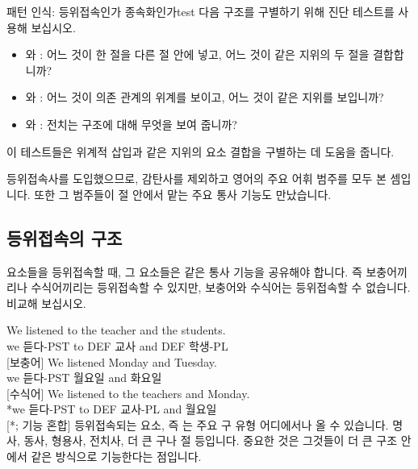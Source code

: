 \begin{tblsframedsymbol}{패턴 인식: 등위접속인가 종속화인가}{test}
다음 구조를 구별하기 위해 진단 테스트를 사용해 보십시오.
\begin{itemize}[noitemsep, leftmargin=*]
    \item {}와 : 어느 것이 한 절을 다른 절 안에 넣고, 어느 것이 같은 지위의 두 절을 결합합니까?
    \item {}와 : 어느 것이 의존 관계의 위계를 보이고, 어느 것이 같은 지위를 보입니까?
    \item {}와 : 전치는 구조에 대해 무엇을 보여 줍니까?
\end{itemize}
이 테스트들은 위계적 삽입과 같은 지위의 요소 결합을 구별하는 데 도움을 줍니다.
\end{tblsframedsymbol}

등위접속사를 도입했으므로, 감탄사를 제외하고 영어의 주요 어휘 범주를 모두 본 셈입니다. 또한 그 범주들이 절 안에서 맡는 주요 통사 기능도 만났습니다.

\subsection{등위접속의 구조}

요소들을 등위접속할 때, 그 요소들은 같은 통사 기능을 공유해야 합니다. 즉 보충어끼리나 수식어끼리는 등위접속할 수 있지만, 보충어와 수식어는 등위접속할 수 없습니다. 비교해 보십시오.

\ea \label{ex:coord-function-ko}
    \ea \gll We listened {\ob}to the teacher{\cb} {\ob}and the students{\cb}.\\
        we 듣다-PST to DEF 교사 and DEF 학생-PL\\
    \glt {} [보충어]
    \ex \gll We listened {\ob}Monday{\cb} and {\ob}Tuesday{\cb}.\\
        we 듣다-PST 월요일 and 화요일\\
    \glt {} [수식어]
    \ex \gll *We listened {\ob}to the teachers{\cb} and {\ob}Monday{\cb}.\\
        *we 듣다-PST to DEF 교사-PL and 월요일\\
    \glt {} [*; 기능 혼합]
    \z
\z
등위접속되는 요소, 즉 는 주요 구 유형 어디에서나 올 수 있습니다. 명사, 동사, 형용사, 전치사, 더 큰 구나 절 등입니다. 중요한 것은 그것들이 더 큰 구조 안에서 같은 방식으로 기능한다는 점입니다.

